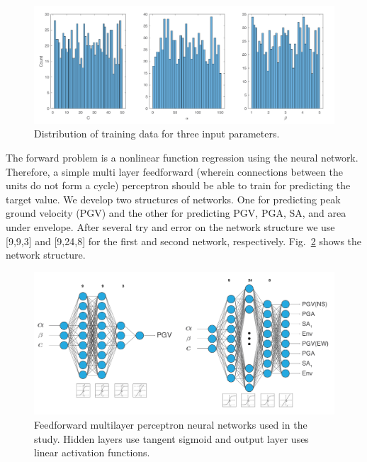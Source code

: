  \begin{figure}[ht]
    \centering
    \includegraphics[width=\textwidth]{figures/pdf/Figure_training_data_statistics.pdf}
    \caption{Distribution of training data for three input parameters.}
    \label{fig:Figure_training_data_statistics}
\end{figure}


The forward problem is a nonlinear function regression using the neural network. Therefore,  a simple multi layer feedforward (wherein connections between the units do not form a cycle) perceptron should be able to train for predicting the target value. We develop two structures  of networks. One for predicting peak ground velocity (PGV) and the other for predicting PGV, PGA, SA, and area under envelope. After several try and error on the network structure we use [9,9,3] and [9,24,8] for the first and second network, respectively. Fig.~\ref{fig:Figure_ann_structure} shows the network structure. 

 \begin{figure}
    \centering
    \includegraphics[width=1\textwidth]{figures/pdf/Figure_ann_structure.pdf}
    \caption{Feedforward multilayer perceptron neural networks used in the study. Hidden layers use tangent sigmoid and output layer uses linear activation functions.}
    \label{fig:Figure_ann_structure}
\end{figure}

